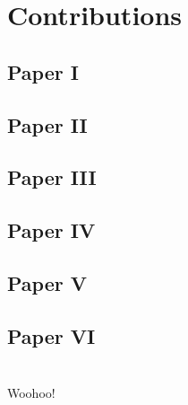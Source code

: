 \documentclass{UUThesisTemplate}
\begin{document}
\chapter{Contributions}
\section*{Paper I}
\section*{Paper II}
\section*{Paper III}
\section*{Paper IV}
\section*{Paper V}
\section*{Paper VI}
\chapter{{}}
{\noteunic
Woohoo!
}
\end{document}
